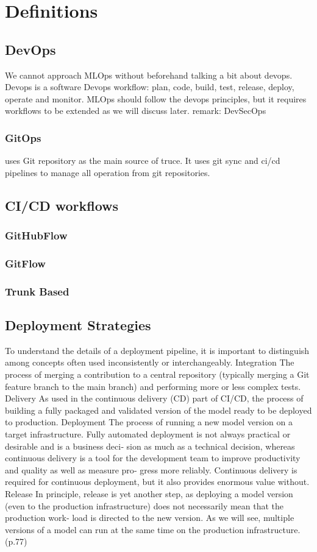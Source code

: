 \section{Definitions}\label{sec:stdefinitions}
\subsection{DevOps}
We cannot approach MLOps without beforehand talking a bit about devops.
Devops is a software
Devops workflow: plan, code, build, test, release, deploy, operate and monitor.
MLOps should follow the devops principles, but it requires workflows to be extended as we will discuss later.
remark: DevSecOps

\subsubsection{GitOps} uses Git repository as the main source of truce.
It uses git sync and ci/cd pipelines to manage all operation from git repositories.
\subsection{CI/CD workflows}
\subsubsection{GitHubFlow}
\subsubsection{GitFlow}
\subsubsection{Trunk Based}
\subsection{Deployment Strategies}

To understand the details of a deployment pipeline, it is important to distinguish
among concepts often used inconsistently or interchangeably.
Integration
The process of merging a contribution to a central repository (typically merging
a Git feature branch to the main branch) and performing more or less complex
tests.
Delivery
As used in the continuous delivery (CD) part of CI/CD, the process of building a
fully packaged and validated version of the model ready to be deployed to
production.
Deployment
The process of running a new model version on a target infrastructure. Fully
automated deployment is not always practical or desirable and is a business deci‐
sion as much as a technical decision, whereas continuous delivery is a tool for the
development team to improve productivity and quality as well as measure pro‐
gress more reliably. Continuous delivery is required for continuous deployment,
but it also provides enormous value without.
Release
In principle, release is yet another step, as deploying a model version (even to the
production infrastructure) does not necessarily mean that the production work‐
load is directed to the new version. As we will see, multiple versions of a model
can run at the same time on the production infrastructure.\cite{treveil2020introducing}(p.77)

